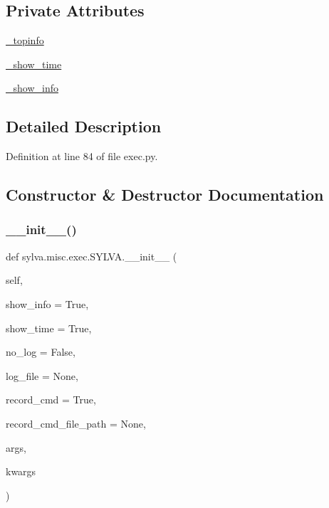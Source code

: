 \subsection*{Private Attributes}
\begin{DoxyCompactItemize}
\item 
\hyperlink{classsylva_1_1misc_1_1exec_1_1_s_y_l_v_a_a13e14ad6b19d8a1b8f2a3ef29a79f748}{\+\_\+topinfo}
\item 
\hyperlink{classsylva_1_1misc_1_1exec_1_1_s_y_l_v_a_a2f88a059b84691c0b96b33336c6166ce}{\+\_\+show\+\_\+time}
\item 
\hyperlink{classsylva_1_1misc_1_1exec_1_1_s_y_l_v_a_a5bf958102447e938581ef6feca2068be}{\+\_\+show\+\_\+info}
\end{DoxyCompactItemize}


\subsection{Detailed Description}


Definition at line 84 of file exec.\+py.



\subsection{Constructor \& Destructor Documentation}
\mbox{\label{classsylva_1_1misc_1_1exec_1_1_s_y_l_v_a_aaab766c5bcef348c46052e70a1066105}} 
\subsubsection{\texorpdfstring{\+\_\+\+\_\+init\+\_\+\+\_\+()}{\_\_init\_\_()}}
{\footnotesize\ttfamily def sylva.\+misc.\+exec.\+S\+Y\+L\+V\+A.\+\_\+\+\_\+init\+\_\+\+\_\+ (\begin{DoxyParamCaption}\item[{}]{self,  }\item[{}]{show\+\_\+info = {\ttfamily True},  }\item[{}]{show\+\_\+time = {\ttfamily True},  }\item[{}]{no\+\_\+log = {\ttfamily False},  }\item[{}]{log\+\_\+file = {\ttfamily None},  }\item[{}]{record\+\_\+cmd = {\ttfamily True},  }\item[{}]{record\+\_\+cmd\+\_\+file\+\_\+path = {\ttfamily None},  }\item[{}]{args,  }\item[{}]{kwargs }\end{DoxyParamCaption})}



